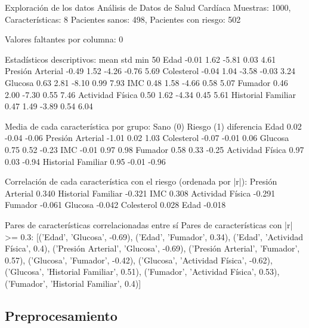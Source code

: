 \documentclass[11pt,letterpaper]{article}
\begin{document}
\begin{consola}[label=out:expl]{Exploración de los datos}
Análisis de Datos de Salud Cardíaca
Muestras: 1000, Características: 8
Pacientes sanos: 498, Pacientes con riesgo: 502

Valores faltantes por columna: 0

Estadísticos descriptivos:
                    mean   std   min   50%
Edad               -0.01  1.62 -5.81  0.03  4.61
Presión Arterial   -0.49  1.52 -4.26 -0.76  5.69
Colesterol         -0.04  1.04 -3.58 -0.03  3.24
Glucosa             0.63  2.81 -8.10  0.99  7.93
IMC                 0.48  1.58 -4.66  0.58  5.07
Fumador             0.46  2.00 -7.30  0.55  7.46
Actividad Física    0.50  1.62 -4.34  0.45  5.61
Historial Familiar  0.47  1.49 -3.89  0.54  6.04

Media de cada característica por grupo:
                    Sano (0)  Riesgo (1)  diferencia
Edad                    0.02       -0.04       -0.06
Presión Arterial       -1.01        0.02        1.03
Colesterol             -0.07       -0.01        0.06
Glucosa                 0.75        0.52       -0.23
IMC                    -0.01        0.97        0.98
Fumador                 0.58        0.33       -0.25
Actividad Física        0.97        0.03       -0.94
Historial Familiar      0.95       -0.01       -0.96

Correlación de cada característica con el riesgo (ordenada por |r|):
Presión Arterial      0.340
Historial Familiar   -0.321
IMC                   0.308
Actividad Física     -0.291
Fumador              -0.061
Glucosa              -0.042
Colesterol            0.028
Edad                 -0.018
\end{consola}

\begin{consola}[label=out:pares]{Pares de características correlacionadas entre sí}
Pares de características con |r| >= 0.3: [('Edad', 'Glucosa', -0.69), ('Edad', 'Fumador', 0.34), ('Edad', 'Actividad Física', 0.4), ('Presión Arterial', 'Glucosa', -0.69), ('Presión Arterial', 'Fumador', 0.57), ('Glucosa', 'Fumador', -0.42), ('Glucosa', 'Actividad Física', -0.62), ('Glucosa', 'Historial Familiar', 0.51), ('Fumador', 'Actividad Física', 0.53), ('Fumador', 'Historial Familiar', 0.4)]
\end{consola}

\subsection{Preprocesamiento}
\end{document}
